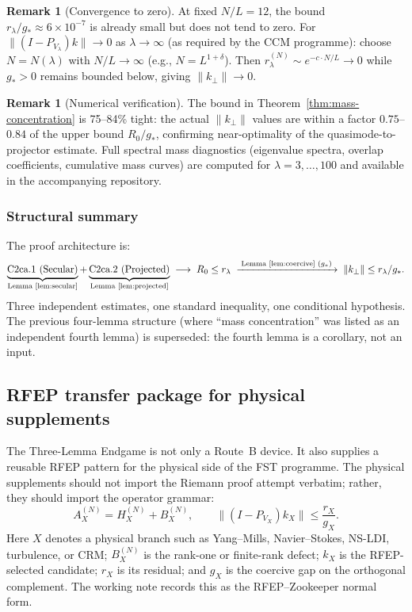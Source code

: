 \documentclass[11pt,a4paper]{article}
\theoremstyle{plain}
\theoremstyle{definition}
\newtheorem{remark}[theorem]{Remark}
\begin{document}
\begin{remark}[Convergence to zero]
At fixed $N/L = 12$, the bound $r_\lambda/g_* \approx 6 \times
10^{-7}$ is already small but does not tend to zero.  For
$\|(I-P_{V_\lambda})k\| \to 0$ as $\lambda \to \infty$ (as required
by the CCM programme): choose $N = N(\lambda)$ with $N/L \to \infty$
(e.g., $N = L^{1+\delta}$).  Then $r_\lambda^{(N)} \sim
e^{-c \cdot N/L} \to 0$ while $g_* > 0$ remains bounded below,
giving $\|k_\perp\| \to 0$.
\end{remark}

\begin{remark}[Numerical verification]
The bound in Theorem~\ref{thm:mass-concentration} is 75--84\% tight:
the actual $\|k_\perp\|$ values are within a factor $0.75$--$0.84$
of the upper bound $R_0/g_*$, confirming near-optimality of the
quasimode-to-projector estimate.  Full spectral mass diagnostics
(eigenvalue spectra, overlap coefficients, cumulative mass curves)
are computed for $\lambda = 3, \ldots, 100$ and available in the
accompanying repository.
\end{remark}

\subsubsection{Structural summary}

The proof architecture is:
\[
\underbrace{\text{C2ca.1 (Secular)}}_{\text{Lemma~\ref{lem:secular}}}
+ \underbrace{\text{C2ca.2 (Projected)}}_{\text{Lemma~\ref{lem:projected}}}
\;\longrightarrow\; R_0 \leq r_\lambda
\;\xrightarrow{\;\text{Lemma~\ref{lem:coercive} } (g_*)\;}
\;\|k_\perp\| \leq r_\lambda / g_*.
\]
Three independent estimates, one standard inequality, one conditional
hypothesis.  The previous four-lemma structure (where ``mass
concentration'' was listed as an independent fourth lemma) is
superseded: the fourth lemma is a corollary, not an input.

\subsection{RFEP transfer package for physical supplements}
\label{sec:rfep-physics-transfer}

The Three-Lemma Endgame is not only a Route~B device.  It also
supplies a reusable RFEP pattern for the physical side of the
FST programme.  The physical supplements should not import the
Riemann proof attempt verbatim; rather, they should import the
operator grammar:
\[
  A_X^{(N)} = H_X^{(N)} + B_X^{(N)}, \qquad
  \|(I-P_{V_X})k_X\| \leq \frac{r_X}{g_X}.
\]
Here $X$ denotes a physical branch such as Yang--Mills,
Navier--Stokes, NS-LDI, turbulence, or CRM; $B_X^{(N)}$ is the
rank-one or finite-rank defect; $k_X$ is the RFEP-selected candidate;
$r_X$ is its residual; and $g_X$ is the coercive gap on the
orthogonal complement.  The working note \cite{RFEPTransferNote}
records this as the RFEP--Zookeeper normal form.
\end{document}
